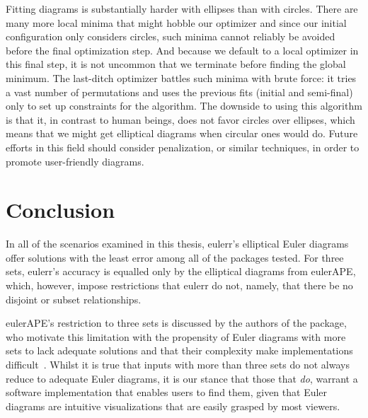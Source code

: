 \documentclass[
  oneside,
  openany,
  numbers=noendperiod,
  parskip=half,
  bibliography=totoc
]{scrbook}\usepackage[]{graphicx}\usepackage{xcolor}
\newcommand{\pkg}[1]{{\fontseries{b}\selectfont #1}}
\begin{document}
Fitting diagrams is substantially harder with ellipses than with circles.
There are many more local minima that might hobble our optimizer
and since our initial configuration only
considers circles, such minima cannot reliably be avoided before the final
optimization step. And because we default to a local optimizer in this final step,
it is not uncommon that we terminate before finding the global minimum.
The last-ditch optimizer
battles such minima with brute force: it tries a vast number of permutations
and uses the previous fits (initial and semi-final) only to set up
constraints for the algorithm. The downside to using this algorithm is that it,
in contrast to human beings, does not favor circles over ellipses, which means
that we might get elliptical diagrams when circular ones would do. Future
efforts in this field should consider penalization, or similar techniques,
in order to promote user-friendly diagrams.

\section{Conclusion}
\label{sec:conclusion}

In all of the scenarios examined in this thesis,
\pkg{eulerr}'s elliptical Euler diagrams offer solutions with the least error
among all of the packages
tested. For three sets, \pkg{eulerr}'s accuracy is equalled only by the elliptical diagrams from
\pkg{eulerAPE}, which, however, impose restrictions that
\pkg{eulerr} do not, namely, that there be no disjoint or subset relationships.

\pkg{eulerAPE}'s restriction to three sets is discussed by the authors of the
package, who motivate this limitation with the propensity of Euler diagrams with
more sets to lack adequate solutions and that their complexity make
implementations difficult~\citep{Micallef_2013}. Whilst it is true that
inputs with more than three sets do not always reduce to adequate Euler diagrams,
it is our stance that those that \emph{do}, warrant a software implementation that
enables users to find them, given that Euler diagrams are intuitive
visualizations that are easily grasped by most viewers.
\end{document}

